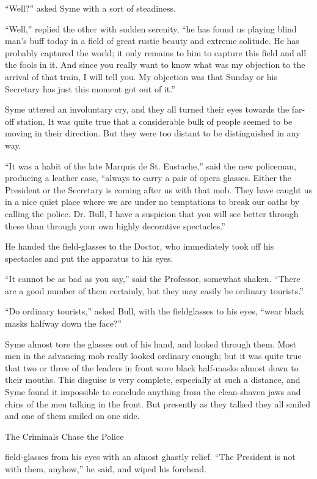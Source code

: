 “Well?” asked Syme with a sort of steadiness.

“Well,” replied the other with sudden serenity, “he has found us playing blind man’s buff today in a field of great rustic beauty and extreme solitude. He has probably captured the world; it only remains to him to capture this field and all the fools in it. And since you really want to know what was my objection to the arrival of that train, I will tell you. My objection was that Sunday or his Secretary has just this moment got out of it.”

Syme uttered an involuntary cry, and they all turned their eyes towards the far-off station. It was quite true that a considerable bulk of people seemed to be moving in their direction. But they were too distant to be distinguished in any way.

“It was a habit of the late Marquis de St. Eustache,” said the new policeman, producing a leather case, “always to carry a pair of opera glasses. Either the President or the Secretary is coming after us with that mob. They have caught us in a nice quiet place where we are under no temptations to break our oaths by calling the police. Dr. Bull, I have a suspicion that you will see better through these than through your own highly decorative spectacles.”

He handed the field-glasses to the Doctor, who immediately took off his spectacles and put the apparatus to his eyes.

“It cannot be as bad as you say,” said the Professor, somewhat shaken. “There are a good number of them certainly, but they may easily be ordinary tourists.”

“Do ordinary tourists,” asked Bull, with the fieldglasses to his eyes, “wear black masks halfway down the face?”

Syme almost tore the glasses out of his hand, and looked through them. Most men in the advancing mob really looked ordinary enough; but it was quite true that two or three of the leaders in front wore black half-masks almost down to their mouths. This disguise is very complete, especially at such a distance, and Syme found it impossible to conclude anything from the clean-shaven jaws and chins of the men talking in the front. But presently as they talked they all smiled and one of them smiled on one side.

\chap[criminalschase] The Criminals Chase the Police

 field-glasses from his eyes with an almost ghastly relief.
\nl
“The President is not with them, anyhow,” he said, and wiped his forehead.

